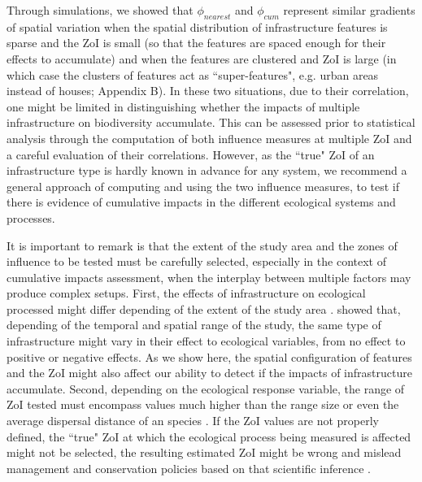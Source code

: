 \documentclass[titlepage]{article}
\begin{document}
Through simulations, we showed that $\phi_{nearest}$ and $\phi_{cum}$ represent similar gradients of spatial variation when the spatial distribution of infrastructure features is sparse and the ZoI is small (so that the features are spaced enough for their effects to accumulate) and when the features are clustered and ZoI is large (in which case the clusters of features act as ``super-features", e.g. urban areas instead of houses; Appendix B). In these two situations, due to their correlation, one might be limited in distinguishing whether the impacts of multiple infrastructure on biodiversity accumulate. This can be assessed prior to statistical analysis through the computation of both influence measures at multiple ZoI and a careful evaluation of their correlations. However, as the ``true" ZoI of an infrastructure type is hardly known in advance for any system, we recommend a general approach of computing and using the two influence measures, to test if there is evidence of cumulative impacts in the different ecological systems and processes.

It is important to remark is that the extent of the study area and the zones of influence to be tested must be carefully selected, especially in the context of cumulative impacts assessment, when the interplay between multiple factors may produce complex setups. First, the effects of infrastructure on ecological processed might differ depending of the extent of the study area \citep{vistnes_matter_2008}. \citet{skarin_human_2014} showed that, depending of the temporal and spatial range of the study, the same type of infrastructure might vary in their effect to ecological variables, from no effect to positive or negative effects. As we show here, the spatial configuration of features and the ZoI might also affect our ability to detect if the impacts of infrastructure accumulate. 
Second, depending on the ecological response variable, the range of ZoI tested must encompass values much higher than the range size or even the average dispersal distance of an species \citep{jackson_what_2012,miguet_what_2016}. If the ZoI values are not properly defined, the ``true" ZoI at which the ecological process being measured is affected might not be selected, the resulting estimated ZoI might be wrong and mislead management and conservation policies based on that scientific inference \citep[e.g.][]{jackson_are_2015}.
\end{document}
